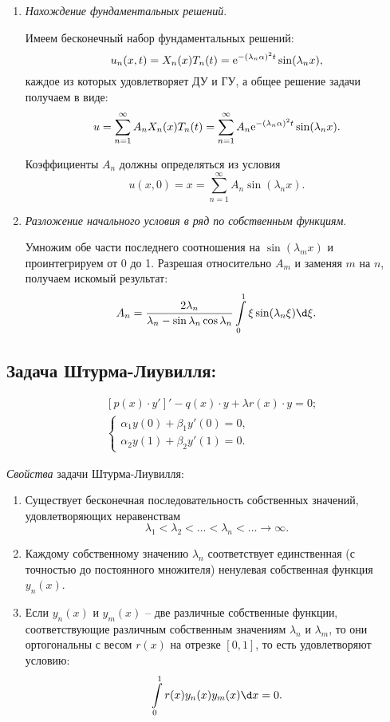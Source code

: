 \begin{enumerate}
    \item \emph{Нахождение фундаментальных решений}.
    
    Имеем бесконечный набор фундаментальных решений:
    \[
        u_n(x, t) = X_n(x)T_n(t) = \mathrm{e}^{-(\lambda_n\alpha)^2t}\sin(\lambda_nx),
    \]
    каждое из которых удовлетворяет ДУ и ГУ, а общее решение задачи получаем в
    виде:
    \[
        u = \sum\limits_{n=1}^\infty A_nX_n(x)T_n(t) = \sum\limits_{n=1}^\infty
        A_n\mathrm{e}^{-(\lambda_n\alpha)^2t}\sin(\lambda_nx).
    \]
    
    Коэффициенты \( A_n \) должны определяться из условия
    \[
        u(x, 0) = x = \sum\limits_{n=1}^\infty A_n\sin(\lambda_nx).
    \]
    
    \item \emph{Разложение начального условия в ряд по собственным функциям}.
    
    Умножим обе части последнего соотношения на \( \sin(\lambda_mx) \) и
    проинтегрируем от 0 до 1. Разрешая относительно \( A_m \) и заменяя \( m \)
    на \( n \), получаем искомый результат:
    \[
        A_n = \frac{2\lambda_n}{\lambda_n - \sin\lambda_n\cos\lambda_n}
        \int\limits_0^1 \xi\sin(\lambda_n\xi)\d\xi.
    \]
\end{enumerate}

\begin{multicols}{2}
\section{Задача Штурма-Лиувилля:}
\begin{align*}
    & [p(x)\cdot y']' - q(x)\cdot y + \lambda r(x)\cdot y = 0; \\
    & \left\{ \begin{array}{l}
        \alpha_1 y(0) + \beta_1 y'(0) = 0, \\
        \alpha_2 y(1) + \beta_2 y'(1) = 0.
    \end{array} \right.
\end{align*}

\emph{Свойства} задачи Штурма-Лиувилля:
\begin{enumerate}
    \item Существует бесконечная последовательность собственных значений,
    удовлетворяющих неравенствам
    \[
        \lambda_1 < \lambda_2 < \ldots < \lambda_n < \ldots \to \infty.
    \]
    \item Каждому собственному значению \( \lambda_n \) соответствует
    единственная (с точностью до постоянного множителя) ненулевая собственная
    функция \( y_n(x) \). 
    \item Если \( y_n(x) \) и \( y_m(x) \) -- две различные собственные функции,
    соответствующие различным собственным значениям \( \lambda_n \) и
    \( \lambda_m \), то они ортогональны с весом \( r(x) \) на отрезке
    \( [0, 1] \), то есть удовлетворяют условию:
    \[
        \int\limits_0^1 r(x)y_n(x)y_m(x)\d x = 0.
    \]
\end{enumerate}
\end{multicols}

\newpage

